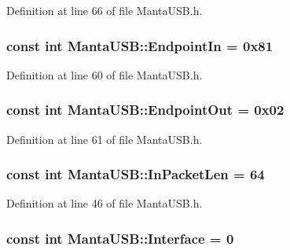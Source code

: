 \-Definition at line 66 of file \-Manta\-U\-S\-B.\-h.

\hypertarget{classMantaUSB_afe5ae885264a5aff980c5c645a3ff9d6}{
\subsubsection[{\-Endpoint\-In}]{\setlength{\rightskip}{0pt plus 5cm}const int {\bf \-Manta\-U\-S\-B\-::\-Endpoint\-In} = 0x81}}\label{classMantaUSB_afe5ae885264a5aff980c5c645a3ff9d6}


\-Definition at line 60 of file \-Manta\-U\-S\-B.\-h.

\hypertarget{classMantaUSB_ab3926f81d0c1b5993d583a34343e0b6d}{
\subsubsection[{\-Endpoint\-Out}]{\setlength{\rightskip}{0pt plus 5cm}const int {\bf \-Manta\-U\-S\-B\-::\-Endpoint\-Out} = 0x02}}\label{classMantaUSB_ab3926f81d0c1b5993d583a34343e0b6d}


\-Definition at line 61 of file \-Manta\-U\-S\-B.\-h.

\hypertarget{classMantaUSB_a13d2528c9c12d91dd34a8f99b3fed0b3}{
\subsubsection[{\-In\-Packet\-Len}]{\setlength{\rightskip}{0pt plus 5cm}const int {\bf \-Manta\-U\-S\-B\-::\-In\-Packet\-Len} = 64}}\label{classMantaUSB_a13d2528c9c12d91dd34a8f99b3fed0b3}


\-Definition at line 46 of file \-Manta\-U\-S\-B.\-h.

\hypertarget{classMantaUSB_acde414c7e155d869f5c399518e32d38d}{
\subsubsection[{\-Interface}]{\setlength{\rightskip}{0pt plus 5cm}const int {\bf \-Manta\-U\-S\-B\-::\-Interface} = 0}}\label{classMantaUSB_acde414c7e155d869f5c399518e32d38d}


